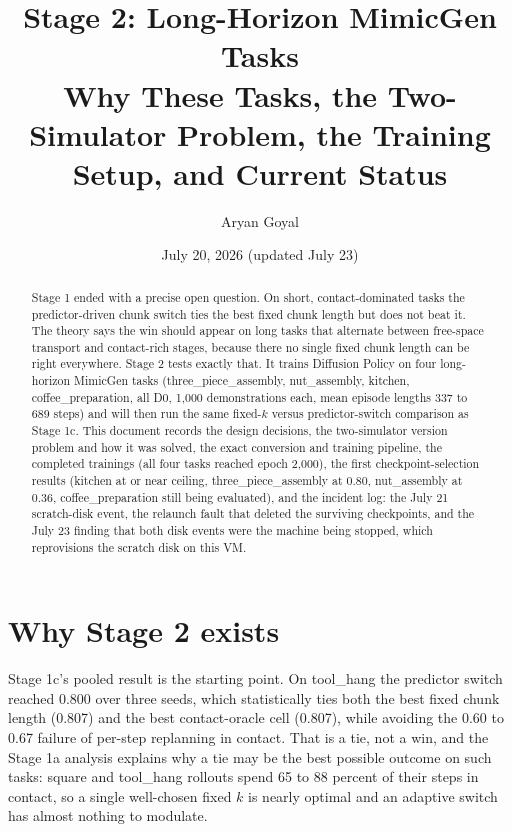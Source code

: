 \documentclass[11pt]{article}
\title{Stage 2: Long-Horizon MimicGen Tasks\\
\large Why These Tasks, the Two-Simulator Problem, the Training Setup, and Current Status}
\author{Aryan Goyal}
\date{July 20, 2026 (updated July 23)}
\begin{document}
\maketitle

\begin{abstract}
\noindent
Stage 1 ended with a precise open question. On short, contact-dominated tasks the
predictor-driven chunk switch ties the best fixed chunk length but does not beat
it. The theory says the win should appear on long tasks that alternate between
free-space transport and contact-rich stages, because there no single fixed
chunk length can be right everywhere. Stage 2 tests exactly that. It trains
Diffusion Policy on four long-horizon MimicGen tasks (three\_piece\_assembly,
nut\_assembly, kitchen, coffee\_preparation, all D0, 1{,}000 demonstrations
each, mean episode lengths 337 to 689 steps) and will then run the same
fixed-$k$ versus predictor-switch comparison as Stage 1c. This document records
the design decisions, the two-simulator version problem and how it was solved,
the exact conversion and training pipeline, the completed trainings (all four
tasks reached epoch 2,000), the first checkpoint-selection results (kitchen at
or near ceiling, three\_piece\_assembly at 0.80, nut\_assembly at 0.36,
coffee\_preparation still being evaluated), and the incident log: the July 21
scratch-disk event, the relaunch fault that deleted the surviving
checkpoints, and the July 23 finding that both disk events were the machine
being stopped, which reprovisions the scratch disk on this VM.
\end{abstract}

\tableofcontents
\newpage

\section{Why Stage 2 exists}
\label{sec:why}

Stage 1c's pooled result is the starting point. On tool\_hang the predictor
switch reached 0.800 over three seeds, which statistically ties both the best
fixed chunk length (0.807) and the best contact-oracle cell (0.807), while
avoiding the 0.60 to 0.67 failure of per-step replanning in contact. That is a
tie, not a win, and the Stage 1a analysis explains why a tie may be the best
possible outcome on such tasks: square and tool\_hang rollouts spend 65 to 88
percent of their steps in contact, so a single well-chosen fixed $k$ is nearly
optimal and an adaptive switch has almost nothing to modulate.
\end{document}
